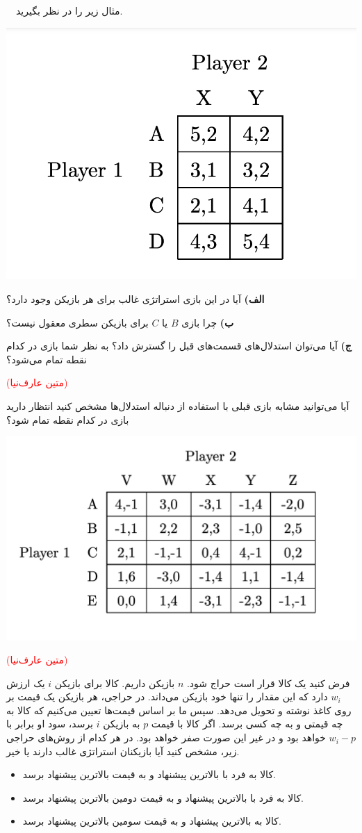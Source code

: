 \documentclass[11pt,a4paper]{article}
\begin{document}
\pagebreak


  مثال زیر را در نظر بگیرید.
	\begin{center}\includegraphics[width=0.3\linewidth]{pics/DSE2}\end{center}
	\textbf{الف)} 
آیا در این بازی استراتژی غالب برای هر بازیکن وجود دارد؟

	\textbf{ب)} 
	چرا بازی $B$ یا $C$ برای بازیکن سطری معقول نیست؟
	
\textbf{ج)} 
آیا می‌توان استدلال‌های قسمت‌های قبل را گسترش داد؟ به نظر شما بازی در کدام نقطه تمام می‌شود؟

\vspace{0.5em}
\textcolor{red}{(متین عارف‌نیا)}


آیا می‌توانید مشابه بازی قبلی با استفاده از دنباله استدلال‌ها مشخص کنید انتظار دارید بازی در کدام نقطه تمام شود؟
	\begin{center}\includegraphics[width=0.4\linewidth]{pics/DSE3}\end{center}
 
\vspace{0.5em}
\textcolor{red}{(متین عارف‌نیا)}




فرض کنید یک کالا قرار است حراج شود. $n$ بازیکن داریم. کالا برای بازیکن $i$ یک ارزش $w_i$ دارد که این مقدار را تنها خود بازیکن می‌داند. در حراجی، هر بازیکن یک قیمت بر روی کاغذ نوشته و تحویل می‌دهد. سپس ما بر اساس قیمت‌ها تعیین می‌کنیم که کالا به چه قیمتی و به چه کسی برسد. اگر کالا با قیمت $p$ به بازیکن $i$ برسد، سود او برابر با $w_i - p$ خواهد بود و در غیر این صورت صفر خواهد بود. در هر کدام از روش‌های حراجی زیر، مشخص کنید آیا بازیکنان استراتژی غالب دارند یا خیر.

\begin{itemize}
	\item کالا به فرد با بالاترین پیشنهاد و به قیمت  بالاترین پیشنهاد برسد.
	\item کالا به فرد با بالاترین پیشنهاد و به قیمت دومین بالاترین پیشنهاد برسد.
	\item کالا به بالاترین پیشنهاد و به قیمت سومین بالاترین پیشنهاد برسد.  
\end{itemize}
\end{document}
